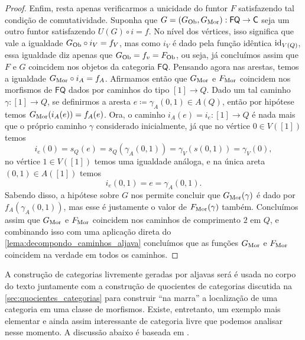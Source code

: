 \begin{proof}
    Enfim, resta apenas verificarmos a unicidade do funtor $F$ satisfazendo tal condição de comutatividade.
    Suponha que $G = (G_{\mathrm{Ob}},G_{\mathrm{Mor}}): \mathsf{FQ} \to \mathsf{C}$ seja um outro funtor satisfazendo $U(G) \circ i = f$.
    No nível dos vértices, isso significa que vale a igualdade $G_{\mathrm{Ob}} \circ i_V = f_V$, mas como $i_V$ é dado pela função idêntica $\mathrm{id}_{V(Q)}$, essa igualdade diz apenas que $G_{\mathrm{Ob}} = f_v = F_{\mathrm{Ob}}$, ou seja, já concluímos assim que $F$ e $G$ coincidem nos objetos da categoria $\mathsf{FQ}$.
    Pensando agora nas arestas, temos a igualdade $G_{\mathrm{Mor}} \circ i_A = f_A$.
    Afirmamos então que $G_{\mathrm{Mor}}$ e $F_{\mathrm{Mor}}$ coincidem nos morfismos de $\mathsf{FQ}$ dados por caminhos do tipo $[1] \to Q$.
    Dado um tal caminho $\gamma: [1] \to Q$, se definirmos a aresta $e \coloneqq \gamma_A(0,1) \in A(Q)$, então por hipótese temos $G_{\mathrm{Mor}}(i_A(e)) = f_A(e)$.
    Ora, o caminho $i_A(e) = i_e: [1] \to Q$ é nada mais que o próprio caminho $\gamma$ considerado inicialmente, já que no vértice $0 \in V([1])$ temos
    \begin{displaymath}
        i_e(0)
        = s_Q(e)
        = s_Q(\gamma_A(0,1))
        = \gamma_V(s(0,1))
        = \gamma_V(0),
    \end{displaymath}
    no vértice $1 \in V([1])$ temos uma igualdade análoga, e na única areta $(0,1) \in A([1])$ temos
    \begin{displaymath}
        i_e(0,1)
        = e
        = \gamma_A(0,1).
    \end{displaymath}
    Sabendo disso, a hipótese sobre $G$ nos permite concluir que $G_{\mathrm{Mor}}(\gamma)$ é dado por $f_A(\gamma_A(0,1))$, mas esse é justamente o valor de $F_{\mathrm{Mor}}(\gamma)$ também.
    Concluímos assim que $G_{\mathrm{Mor}}$ e $F_{\mathrm{Mor}}$ coincidem nos caminhos de comprimento $2$ em $Q$, e combinando isso com uma aplicação direta do \cref{lema:decompondo_caminhos_aljava} concluímos que as funções $G_{\mathrm{Mor}}$ e $F_{\mathrm{Mor}}$ coincidem na verdade em todos os caminhos.
\end{proof}

A construção de categorias livremente geradas por aljavas será é usada no corpo do texto juntamente com a construção de quocientes de categorias discutida na \cref{sec:quocientes_categorias} para  construir ``na marra'' a localização de uma categoria em uma classe de morfismos.
Existe, entretanto, um exemplo mais elementar e ainda assim interessante de categoria livre que podemos analisar nesse momento.
A discussão abaixo é baseada em \cite[Capítulo 2, Seção 7, Corolário 2]{mac_lane_categories_1978}.

